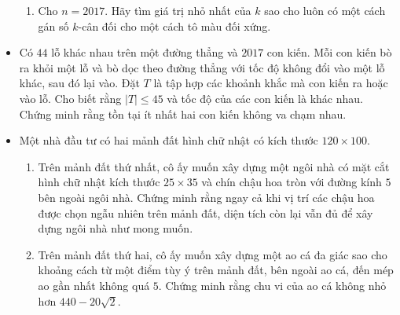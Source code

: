 \documentclass[11pt]{scrartcl}
\begin{document}
\begin{itemize}[label=, leftmargin=0em, itemsep=0.5em]
\begin{btvn}
\begin{enumerate}[label=(\alph*)]
        \item Cho $n=2017$. Hãy tìm giá trị nhỏ nhất của $k$ sao cho luôn có một cách gán số $k$-cân đối cho một cách tô màu đối xứng.
\end{enumerate}

    \end{btvn}

    \item \begin{btvn} Có $44$ lỗ khác nhau trên một đường thẳng và $2017$ con kiến. Mỗi con kiến bò ra khỏi một lỗ và bò dọc theo đường thẳng với tốc độ không đổi vào một lỗ khác, sau đó lại vào. Đặt $T$ là tập hợp các khoảnh khắc mà con kiến ra hoặc vào lỗ. Cho biết rằng $|T|\leq 45$ và tốc độ của các con kiến là khác nhau. Chứng minh rằng tồn tại ít nhất hai con kiến không va chạm nhau.
    \end{btvn}


    \item \begin{btvn}
        Một nhà đầu tư có hai mảnh đất hình chữ nhật có kích thước $120\times 100$.
        \begin{enumerate}[label=(\alph*)]
            \item Trên mảnh đất thứ nhất, cô ấy muốn xây dựng một ngôi nhà có mặt cắt hình chữ nhật kích thước $25\times 35$ và chín chậu hoa tròn với đường kính $5$ bên ngoài ngôi nhà. Chứng minh rằng ngay cả khi vị trí các chậu hoa được chọn ngẫu nhiên trên mảnh đất, diện tích còn lại vẫn đủ để xây dựng ngôi nhà như mong muốn.
            \item Trên mảnh đất thứ hai, cô ấy muốn xây dựng một ao cá đa giác sao cho khoảng cách từ một điểm tùy ý trên mảnh đất, bên ngoài ao cá, đến mép ao gần nhất không quá $5$. Chứng minh rằng chu vi của ao cá không nhỏ hơn $440-20\sqrt{2}$.
        \end{enumerate}
    \end{btvn}


\end{itemize}
\end{document}
